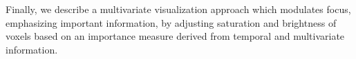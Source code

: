 \documentclass[a4paper, 12pt, twoside, openright]{report}         %
\begin{document}
\begin{thesisabstract}
Finally, we describe a multivariate visualization approach which modulates focus, emphasizing important information, by adjusting saturation and brightness of voxels based on an importance measure derived from temporal and multivariate information.





\end{thesisabstract}
\end{document}
